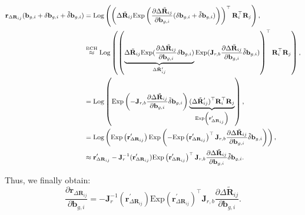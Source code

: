 \begin{equation}\label{key}
	\small
	\begin{aligned}
		\mathbf{r}_{\Delta \mathbf{R}_{ij}} (\mathbf{b}_{g,i} + \delta \mathbf{b}_{g,i} + \tilde{\delta} \mathbf{b}_{g,i}) &= 
		\mathrm{Log}\left( \left( \Delta \tilde{\mathbf{R}}_{ij} \mathrm{Exp} \left( \frac{\partial \Delta 
			\tilde{\mathbf{R}}_{ij}}{\partial \mathbf{b}_{g,i}} (\delta \mathbf{b}_{g,i} + \tilde{\delta} \mathbf{b}_{g,i}) \right) 
		\right)^\top \mathbf{R}_i^\top \mathbf{R}_j \right), \\
		&\buildrel\text{BCH}\over\approx \mathrm{Log} \left( \left( \underbrace{\Delta \tilde{\mathbf{R}}_{ij} 
			\mathrm{Exp} (\frac{\partial \Delta \tilde{\mathbf{R}}_{ij}}{\partial \mathbf{b}_{g,i}} \delta 
			\mathbf{b}_{g,i})}_{\Delta \tilde{\mathbf{R}}_{ij}^\prime} \mathrm{Exp} (\mathbf{J}_{r, b} \frac{\partial \Delta 
			\tilde{\mathbf{R}}_{ij}}{\partial \mathbf{b}_{g,i}} \tilde{\delta} \mathbf{b}_{g,i}) \right)^\top 
		\mathbf{R}_i^\top \mathbf{R}_j \right), \\
		&= \mathrm{Log} \left( \mathrm{Exp} \left(-\mathbf{J}_{r,b} \frac{\partial \Delta 
			\tilde{\mathbf{R}}_{ij}}{\partial \mathbf{b}_{g,i}} \tilde{\delta} \mathbf{b}_{g,i} \right) \underbrace{(\Delta 
			\tilde{\mathbf{R}}_{ij}^\prime)^\top \mathbf{R}_i^\top \mathbf{R}_j}_{ \mathrm{Exp} \left( 
			\mathbf{r}_{ \Delta \mathbf{R}_{ij}}^\prime \right)} \right), \\
		&= \mathrm{Log} \left( \mathrm{Exp} \left(\mathbf{r}_{\Delta \mathbf{R}_{ij}}^\prime \right) \mathrm{Exp} 
		\left( - \mathrm{Exp}\left(\mathbf{r}_{\Delta \mathbf{R}_{ij}}^\prime \right)^\top \mathbf{J}_{r,b} 
		\frac{\partial \Delta \tilde{\mathbf{R}}_{ij}}{\partial \mathbf{b}_{g,i}} \tilde{\delta} \mathbf{b}_{g,i} \right)  \right), \\
		&\approx \mathbf{r}_{\Delta \mathbf{R}_{ij}}^\prime - \mathbf{J}_r^{-1} (\mathbf{r}_{\Delta \mathbf{R}_{ij}}^\prime ) 
		\mathrm{Exp}\left(\mathbf{r}_{\Delta \mathbf{R}_{ij}}^\prime \right)^\top \mathbf{J}_{r,b} \frac{\partial 
			\Delta \tilde{\mathbf{R}}_{ij}}{\partial \mathbf{b}_{g,i}} \tilde{\delta} \mathbf{b}_{g,i} .
	\end{aligned}
\end{equation}

Thus, we finally obtain:
\begin{equation}\label{key}
	\frac{\partial \mathbf{r}_{\Delta \mathbf{R}_{ij}}}{\partial \mathbf{b}_{g,i}} = - \mathbf{J}_r^{-1} (\mathbf{r}_{\Delta 
		\mathbf{R}_{ij}}^\prime ) \mathrm{Exp}\left(\mathbf{r}_{\Delta \mathbf{R}_{ij}}^\prime \right)^\top 
	\mathbf{J}_{r,b} \frac{\partial \Delta \tilde{\mathbf{R}}_{ij}}{\partial \mathbf{b}_{g,i}}.
\end{equation}

